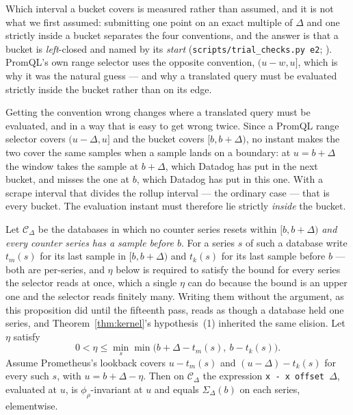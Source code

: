 Which interval a bucket covers is measured rather than assumed, and it is not what we
first assumed: submitting one point on an exact multiple of $\Delta$ and one strictly
inside a bucket separates the four conventions, and the answer is that a bucket is
\emph{left}-closed and named by its \emph{start}
(\texttt{scripts\slash trial\_checks.py e2}; ). PromQL's
own range selector uses the opposite convention, $(u-w,u]$, which is why it was the
natural guess --- and why a translated query must be evaluated strictly inside the
bucket rather than on its edge.

\iffull\fi

\inlineonly{\noindent}%
Getting the convention wrong changes where a translated query must be evaluated, and
in a way that is easy to get wrong twice. Since a PromQL range selector
covers $(u-\Delta,u]$ and the bucket covers $[b,b+\Delta)$, no instant makes the two
cover the same samples when a sample lands on a boundary: at $u=b+\Delta$ the window
takes the sample at $b+\Delta$, which Datadog has put in the next bucket, and misses the
one at $b$, which Datadog has put in this one. With a scrape interval that divides the
rollup interval --- the ordinary case --- that is every bucket. The evaluation instant
must therefore lie strictly \emph{inside} the bucket.

\begin{proposition}\label{prop:offset}
Let $\mathcal{C}_{\Delta}$ be the databases in which no counter series resets within
$[b,b+\Delta)$ \emph{and every counter series has a sample before $b$}. For a series $s$
of such a database write $t_m(s)$ for its last sample in $[b,b+\Delta)$ and $t_k(s)$ for
its last sample before $b$ --- both are per-series, and $\eta$ below is required to
satisfy the bound for every series the selector reads at once, which a single $\eta$ can
do because the bound is an upper one and the selector reads finitely many. Writing them
without the argument, as this proposition did until the fifteenth pass, reads as though a
database held one series, and Theorem~\ref{thm:kernel}'s hypothesis~(1) inherited the
same elision. Let $\eta$ satisfy
\[
0<\eta\le\min_s\min\big(b+\Delta-t_m(s),\ b-t_k(s)\big).
\]
Assume Prometheus's lookback covers $u-t_m(s)$ and $(u-\Delta)-t_k(s)$ for every such $s$,
with $u=b+\Delta-\eta$. Then on $\mathcal{C}_{\Delta}$ the expression
\texttt{x - x offset $\Delta$}, evaluated at $u$, is $\phi_\rho$-invariant at $u$ and
equals $\Sigma_\Delta(b)$ on each series, elementwise.
\end{proposition}
\iffull\fi

